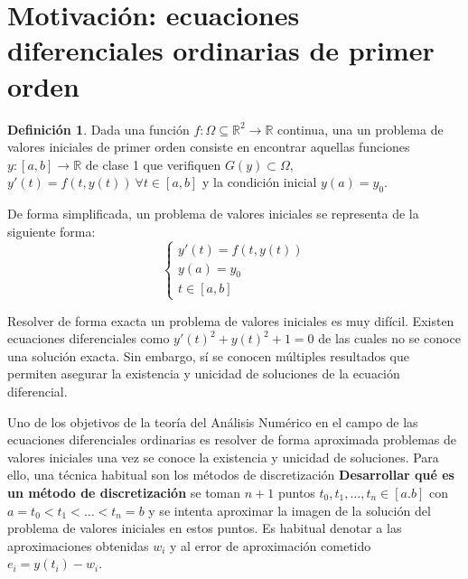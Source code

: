 \documentclass{article}
\theoremstyle{theorem-style}  %
\theoremstyle{definition}
\newtheorem{definition}{Definición}[section]
\theoremstyle{example-style}
\begin{document}
\maketitle



\newpage
\tableofcontents
\newpage


\section{Motivación: ecuaciones diferenciales ordinarias de primer orden} \label{sec:motivacion}

	\begin{definition} 
		Dada una función $f:\Omega \subseteq \mathbb R^2  \to \mathbb{R}$ continua, una un problema de valores iniciales de primer orden consiste en encontrar aquellas funciones $y: [a,b] \rightarrow \mathbb{R}$ de clase 1 que verifiquen $G(y) \subset \Omega$, $y'(t) = f(t,y(t)) \ \forall t \in [a,b]$ y la condición inicial $y(a) = y_0$.  
	\end{definition}

	De forma simplificada, un problema de valores iniciales se representa de la siguiente forma: 
	\begin{equation*}
		\begin{cases}
			y'(t) = f(t,y(t)) \\
			y(a) = y_0 \\
			t \in [a,b]
		\end{cases}
	\end{equation*}

	Resolver de forma exacta un problema de valores iniciales es muy difícil. Existen ecuaciones diferenciales como $y'(t)^2 + y(t)^2 + 1 = 0$ de las cuales no se conoce una solución exacta. Sin embargo, sí se conocen múltiples resultados que permiten asegurar la existencia y unicidad de soluciones de la ecuación diferencial.


	Uno de los objetivos de la teoría del Análisis Numérico en el campo de las ecuaciones diferenciales ordinarias es resolver de forma aproximada problemas de valores iniciales una vez se conoce la existencia y unicidad de soluciones. Para ello, una técnica habitual son los métodos de discretización \textbf{Desarrollar qué es un método de discretización}  se toman $n+1$ puntos $t_0, t_1, \ldots, t_n \in [a.b]$ con $a = t_0 < t_1 < \ldots < t_n = b$ y se intenta aproximar la imagen de la solución del problema de valores iniciales en estos puntos. Es habitual denotar a las aproximaciones obtenidas $w_i$ y al error de aproximación cometido $e_i = y(t_i) - w_i$.
\end{document}
